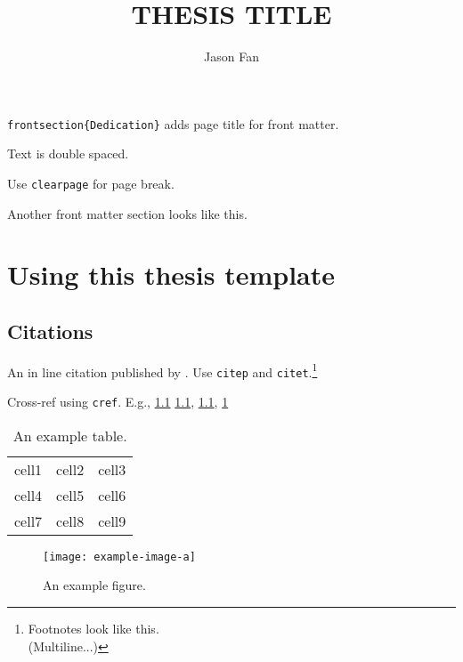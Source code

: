 \documentclass{thesis}
\author{Jason Fan}
\title{THESIS TITLE}
\begin{document}
\begin{abstract}
    \lipsum[1-3]
\end{abstract}

\maketitlepage
\makecopyrightpage

\frontmatter

\texttt{frontsection\{Dedication\}} adds page title for front matter.

Text is double spaced.

Use \texttt{clearpage} for page break.

\clearpage

Another front matter section looks like this.

\lipsum[1]
\clearpage

\maketoc %

\mainmatter

\chapter{Using this thesis template}
\label{chap:1}

\section{Citations}
\label{sec:1}

An in line citation \citep{fan2022} published by \citet{fan2022}. Use \texttt{citep} and \texttt{citet}.\footnote{Footnotes look like this.\\ (Multiline...)}

Cross-ref using \texttt{cref}. E.g., \cref{tab:1} \cref{fig:1}, \cref{sec:1}, \cref{chap:1}

\begin{table}[h]
\begin{center}
    \begin{tabular}{ c c c }
     cell1 & cell2 & cell3 \\ 
     cell4 & cell5 & cell6 \\  
     cell7 & cell8 & cell9    
    \end{tabular}
\end{center}
\caption{An example table. \lipsum[1]}
\label{tab:1}
\end{table}

\begin{figure}[h]
    \centering
    \texttt{[image: example-image-a]}
    \caption{An example figure. \lipsum[1]}
    \label{fig:1}
\end{figure}
\end{document}
